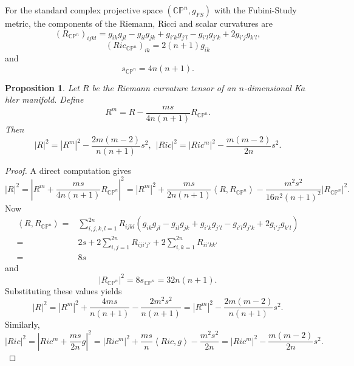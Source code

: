 \documentclass{amsart}
\newtheorem{proposition}[theorem]{Proposition}
\theoremstyle{definition}
\theoremstyle{remark}
\numberwithin{equation}{section}
\begin{document}
For the standard complex projective space $\left( \mathbb{CP}^n,g_{FS} \right)$ with the Fubini-Study metric, the components of the Riemann, Ricci and scalar curvatures are
$${\left( {{R_{\mathbb{C}{\mathbb{P}^n}}}} \right)_{ijkl}} = {g_{ik}}{g_{jl}} - {g_{il}}{g_{jk}} + {g_{i'k}}{g_{j'l}} - {g_{i'l}}{g_{j'k}} + 2{g_{i'j}}{g_{k'l}},$$
$${\left( {Ric_{\mathbb{C}{\mathbb{P}^n}}} \right)_{ik}} = 2\left( {n + 1} \right){g_{ik}}$$
and
$$s_{\mathbb{C}{\mathbb{P}^n}} = 4n\left( {n + 1} \right).$$
\begin{proposition}
\label{proposition4.4}
Let $R$ be the Riemann curvature tensor of an $n$-dimensional K$\ddot a$hler manifold. Define $${R^m} = R - {\frac{{ms}}{{4n\left( {n + 1} \right)}}}R_{\mathbb{CP}^n}.$$ Then
$${\left| R \right|^2} = {\left| {{R^m}} \right|^2} - \frac{{2m\left( {m - 2} \right)}}{{n\left( {n + 1} \right)}}{s^2},\ \
{\left| {Ric} \right|^2} = {\left| {Ri{c^m}} \right|^2} - \frac{{m\left( {m - 2} \right)}}{{2n}}{s^2}.$$
\end{proposition}
\begin{proof}
A direct computation gives
$${\left| R \right|^2} = {\left| {{R^m} + \frac{{ms}}{{4n\left( {n + 1} \right)}}{R_{\mathbb{C}{\mathbb{P}^n}}}} \right|^2} = {\left| {{R^m}} \right|^2} + \frac{{ms}}{{2n\left( {n + 1} \right)}}\left\langle {R,{R_{\mathbb{C}{\mathbb{P}^n}}}} \right\rangle  - \frac{{{m^2}{s^2}}}{{16{n^2}{{\left( {n + 1} \right)}^2}}}{\left| {{R_{\mathbb{C}{\mathbb{P}^n}}}} \right|^2}.$$
Now
\begin{align*}
  \left\langle {R,{R_{\mathbb{C}{\mathbb{P}^n}}}} \right\rangle  =& \sum\limits_{i,j,k,l = 1}^{2n} {{R_{ijkl}}\left( {{g_{ik}}{g_{jl}} - {g_{il}}{g_{jk}} + {g_{i'k}}{g_{j'l}} - {g_{i'l}}{g_{j'k}} + 2{g_{i'j}}{g_{k'l}}} \right)}   \\
   =& 2s + 2\sum\limits_{i,j = 1}^{2n} {{R_{iji'j'}}}  + 2\sum\limits_{i,k = 1}^{2n} {{R_{ii'kk'}}}   \\
   =& 8s
\end{align*}
and
 $${\left| {{R_{\mathbb{C}{\mathbb{P}^n}}}} \right|^2} = 8{s_{\mathbb{C}{\mathbb{P}^n}}} = 32n\left( {n + 1} \right).$$
Substituting these values yields
$${\left| R \right|^2} = {\left| {{R^m}} \right|^2} + \frac{{4ms}}{{n\left( {n + 1} \right)}} - \frac{{2{m^2}{s^2}}}{{n\left( {n + 1} \right)}} = {\left| {{R^m}} \right|^2} - \frac{{2m\left( {m - 2} \right)}}{{n\left( {n + 1} \right)}}{s^2}.$$
Similarly,
$${\left| {Ric} \right|^2} = {\left| {Ri{c^m} + \frac{{ms}}{{2n}}g} \right|^2} = {\left| {Ri{c^m}} \right|^2} + \frac{{ms}}{n}\left\langle {Ric,g} \right\rangle  - \frac{{{m^2}{s^2}}}{{2n}} = {\left| {Ri{c^m}} \right|^2} - \frac{{m\left( {m - 2} \right)}}{{2n}}{s^2}.$$
\end{proof}
\end{document}
